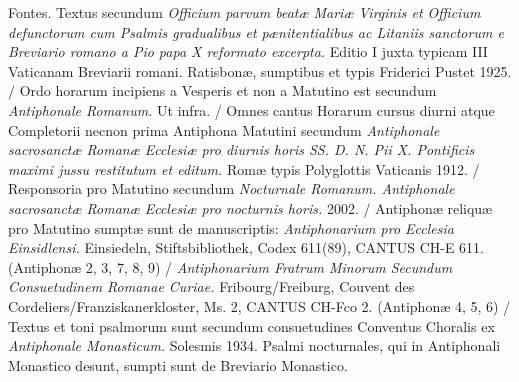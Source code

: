 \documentclass[a4paper, twoside, 12pt]{article}
\begin{document}

\vfill



\pagebreak



\pagebreak



\pagebreak



\pagebreak






\fancyhead[LE]{\thepage\ / }
\fancyhead[RO]{ / \thepage}



\pagebreak





\pagebreak



\pagestyle{empty}

\tableofcontents

\vfill


Fontes. 
Textus secundum 
\textit{Officium parvum beatæ Mariæ Virginis et Officium
defunctorum cum Psalmis gradualibus et pænitentialibus ac Litaniis sanctorum
e Breviario romano a Pio papa X reformato excerpta.}
Editio I juxta typicam III Vaticanam Breviarii romani. 
Ratisbonæ, sumptibus et typis Friderici Pustet 1925. /
Ordo horarum incipiens a Vesperis et non a Matutino est secundum
\textit{Antiphonale Romanum.} Ut infra. /
Omnes cantus Horarum cursus diurni atque Completorii 
necnon prima Antiphona Matutini secundum
\textit{Antiphonale sacrosanctæ Romanæ Ecclesiæ pro diurnis horis
SS. D. N. Pii X. Pontificis maximi jussu restitutum et editum.}
Romæ typis Polyglottis Vaticanis 1912. /
Responsoria pro Matutino secundum 
\textit{Nocturnale Romanum. Antiphonale sacrosanctæ Romanæ Ecclesiæ
pro nocturnis horis.}
2002. /
Antiphonæ reliquæ pro Matutino sumptæ sunt de manuscriptis:
\textit{Antiphonarium pro Ecclesia Einsidlensi.}
Einsiedeln, Stiftsbibliothek, Codex 611(89), CANTUS CH-E 611.
(Antiphonæ 2, 3, 7, 8, 9) /
\textit{Antiphonarium Fratrum Minorum Secundum Consuetudinem Romanae Curiae.}
Fribourg/Freiburg, Couvent des Cordeliers/Franziskanerkloster, Ms. 2,
CANTUS CH-Fco 2.
(Antiphonæ 4, 5, 6) /
Textus et toni psalmorum sunt secundum consuetudines Conventus Choralis
ex \textit{Antiphonale Monasticum.} Solesmis 1934. Psalmi nocturnales,
qui in Antiphonali Monastico desunt, sumpti sunt de Breviario Monastico.
\end{document}
